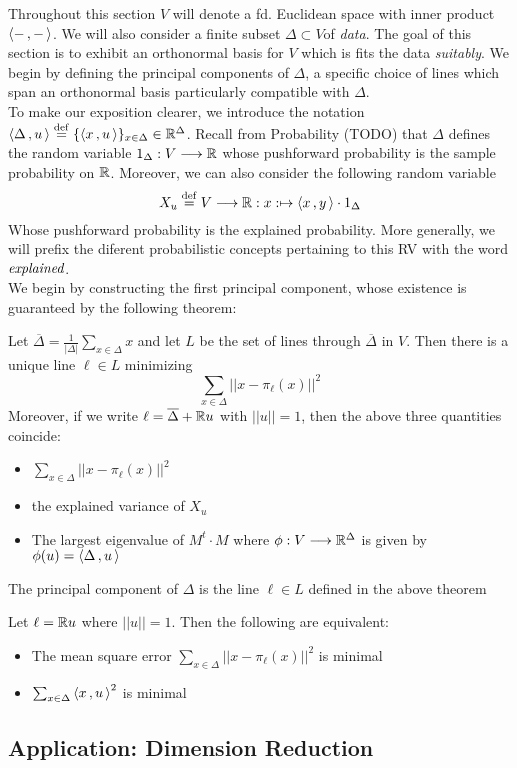 Throughout this section $V$ will denote a fd. Euclidean space with inner product $\left\langle -\,,-\, \right\rangle$. We will also consider a finite subset $\Delta\subset V$of \emph{data}. The goal of this section is to exhibit an orthonormal basis for $V$ which is fits the data \emph{suitably}. We begin by defining the principal components of $\Delta$, a specific choice of lines  which span an orthonormal basis particularly compatible with $\Delta$.\\
To make our exposition clearer, we introduce the notation $\left\langle \Delta\,,u\, \right\rangle\stackrel{\operatorname{def}}{=} \{\left\langle x\,,u\, \right\rangle\}_{x\in \Delta}\in \mathbb{R}^\Delta$. Recall from Probability (TODO) that $\Delta$ defines the random variable $1_\Delta: V\longrightarrow \mathbb{R}$ whose pushforward probability is the sample probability on $\mathbb{R}$. Moreover, we can also consider the following random variable
\[
X_u\stackrel{\operatorname{def}}{=} V\longrightarrow \mathbb{R}: x:\mapsto \left\langle x\,,y\, \right\rangle\cdot1_\Delta
\]
Whose pushforward probability is the explained probability. More generally, we will prefix the diferent probabilistic concepts pertaining to this RV with the word $\emph{explained}$.\\ 
We begin by constructing the first principal component, whose existence is guaranteed by the following theorem:

\begin{theorem}
\label{theorem:principal_component}
Let $\overline{\Delta}= \frac{1}{\vert \Delta\vert}\sum_{x\in \Delta} x$ and let $L$ be the set of lines through $\overline{\Delta}$ in $V$. Then there is a unique line $\ell \in L$ minimizing
\[
\sum_{x \in \Delta} \vert\vert x-\pi_\ell(x) \vert\vert^2
\]
Moreover, if we write $\ell=\overline{\Delta}+\mathbb{R}u$ with $\vert \vert u\vert \vert =1$, then the above three quantities coincide:
\begin{itemize}
\item $\sum_{x \in \Delta} \vert\vert x-\pi_\ell(x) \vert\vert^2$
\item the explained variance of $X_u$
\item The largest eigenvalue of $M^t\cdot M$ where $\phi: V\longrightarrow \mathbb{R}^\Delta$ is given by $\phi(u)=\left\langle \Delta\,,u\, \right\rangle$ 
\end{itemize}
\end{theorem}

\begin{definition}
\label{definition:principal_component}
The principal component of $\Delta$ is the line $\ell \in L$ defined in the above theorem
\end{definition}

\begin{lemma}
\label{lemma:mse_variance}
Let $\ell = \mathbb{R}u$ where $\vert \vert u\vert \vert=1$. Then the following are equivalent:
\begin{itemize}
\item The mean square error $\sum_{x \in \Delta} \vert\vert x- \pi_\ell(x)\vert\vert^2$ is minimal
\item  $\sum_{x \in \Delta} \left\langle x\,,u\, \right\rangle^2$ is minimal
\end{itemize}\subsection{Application: Dimension Reduction}
\end{lemma}

